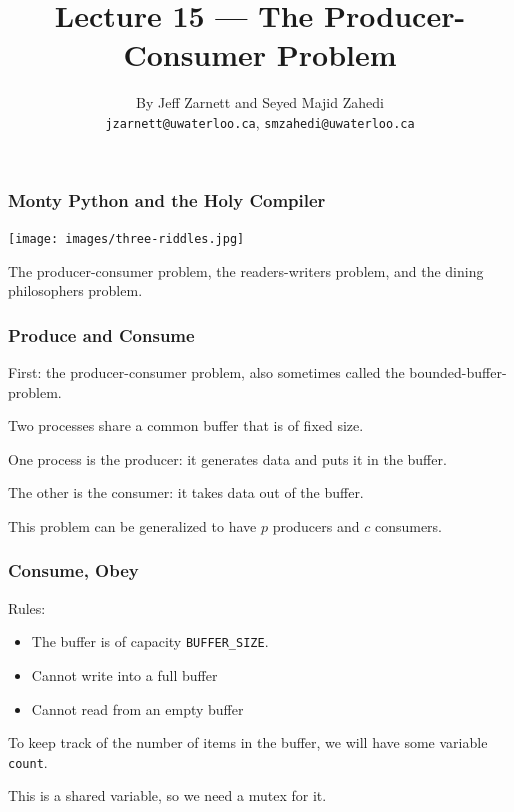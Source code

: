 

\title{Lecture 15 --- The Producer-Consumer Problem }

\author{By Jeff Zarnett and Seyed Majid Zahedi \\ \small \texttt{jzarnett@uwaterloo.ca}, \texttt{smzahedi@uwaterloo.ca}}
\date{}




\begin{frame}
	\titlepage

\end{frame}


\begin{frame}
	\frametitle{Monty Python and the Holy Compiler}

	\begin{center}
		\texttt{[image: images/three-riddles.jpg]}
	\end{center}

	The producer-consumer problem, the readers-writers problem, and the dining philosophers problem.

\end{frame}


\begin{frame}
	\frametitle{Produce and Consume}

	First: the producer-consumer problem, also sometimes called the bounded-buffer-problem.

	Two processes share a common buffer that is of fixed size.

	One process is the producer: it generates data and puts it in the buffer.

	The other is the consumer: it takes data out of the buffer.

	This problem can be generalized to have $p$ producers and $c$ consumers.

\end{frame}

\begin{frame}
	\frametitle{Consume, Obey}

	Rules:
	\begin{itemize}
		\item The buffer is of capacity \texttt{BUFFER\_SIZE}.
		\item Cannot write into a full buffer
		\item Cannot read from an empty buffer
	\end{itemize}

	To keep track of the number of items in the buffer, we will have some variable \texttt{count}.

	This is a shared variable, so we need a mutex for it.

\end{frame}


